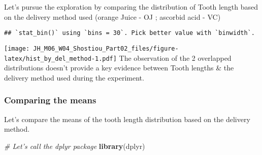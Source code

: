 \documentclass[
]{article}
\newenvironment{Shaded}{\begin{snugshade}}{\end{snugshade}}
\newcommand{\CommentTok}[1]{\textcolor[rgb]{0.56,0.35,0.01}{\textit{#1}}}
\newcommand{\DataTypeTok}[1]{\textcolor[rgb]{0.13,0.29,0.53}{#1}}
\newcommand{\FloatTok}[1]{\textcolor[rgb]{0.00,0.00,0.81}{#1}}
\newcommand{\KeywordTok}[1]{\textcolor[rgb]{0.13,0.29,0.53}{\textbf{#1}}}
\newcommand{\NormalTok}[1]{#1}
\newcommand{\OperatorTok}[1]{\textcolor[rgb]{0.81,0.36,0.00}{\textbf{#1}}}
\newcommand{\StringTok}[1]{\textcolor[rgb]{0.31,0.60,0.02}{#1}}
\begin{document}
Let's pursue the exploration by comparing the distribution of Tooth
length based on the delivery method used (orange Juice - OJ ; ascorbid
acid - VC)

\begin{Shaded}
\end{Shaded}

\begin{verbatim}
## `stat_bin()` using `bins = 30`. Pick better value with `binwidth`.
\end{verbatim}

\texttt{[image: JH\_M06\_W04\_Shostiou\_Part02\_files/figure-latex/hist\_by\_del\_method-1.pdf]}
The observation of the 2 overlapped distributions doesn't provide a key
evidence between Tooth lengths \& the delivery method used during the
experiment.

\hypertarget{comparing-the-means}{%
\subsubsection{Comparing the means}\label{comparing-the-means}}

Let's compare the means of the tooth length distribution based on the
delivery method.

\begin{Shaded}
\begin{Highlighting}[]
\CommentTok{# Let's call the dplyr package}
\KeywordTok{library}\NormalTok{(dplyr)}
\end{Highlighting}
\end{Shaded}
\end{document}
